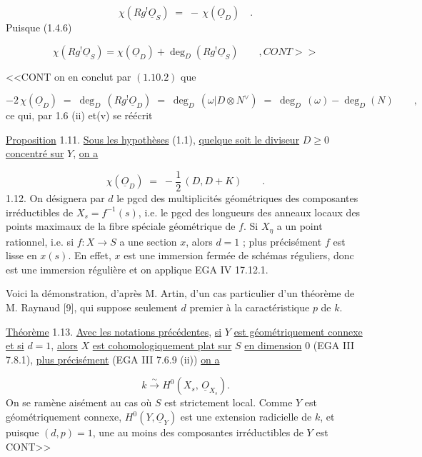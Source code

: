 \begin{equation*}
\chi(Rg^{!}\underline{O}_S) \;=\; -\,\chi(\underline{O}_D) \quad .
\end{equation*}
Puisque (1.4.6)

\begin{equation*}
\chi(Rg^{!}\underline{O}_S) = \chi(\underline{O}_D) + \deg_D(Rg^{!}\underline{O}_S) \qquad , CONT>>
\end{equation*}


<<CONT on en conclut par $(1.10.2)$ que

\begin{equation*}
- 2\,\chi(\underline{O}_D) \;=\; \deg_D\,(Rg^{!}\underline{O}_D) \;=\; \deg_D\,(\omega|D \otimes N^{\vee}) \;=\; \deg_D\,(\omega) - \deg_D(N) \qquad ,
\end{equation*}
ce qui, par 1.6 (ii) et(v) se réécrit

\underline{Proposition} 1.11. \underline{Sous les hypothèses} (1.1), \underline{quelque soit le diviseur} $D \geq 0$ \underline{concentré sur} $Y$, \underline{on a}

\begin{equation*}
\chi(\underline{O}_D) \;=\; - \frac{1}{2}\,(D,D+K) \qquad .
\end{equation*}
1.12. On désignera par $d$ le pgcd des multiplicités géométriques des composantes irréductibles de $X_s = f^{-1}(s)$, i.e. le pgcd des longueurs des anneaux locaux des points maximaux de la fibre spéciale géométrique de $f$. Si $X_{\eta}$ a un point rationnel, i.e. si $f : X \longrightarrow S$ a une section $x$, alors $d = 1$ ; plus précisément $f$ est lisse en $x(s)$. En effet, $x$ est une immersion fermée de schémas réguliers, donc est une immersion régulière et on applique EGA IV 17.12.1.

Voici la démonstration, d'après M. Artin, d'un cas particulier d'un théorème de M. Raynaud [9], qui suppose seulement $d$ premier à la caractéristique $p$ de $k$.

\underline{Théorème} 1.13. \underline{Avec les notations précédentes}, \underline{si} $Y$ \underline{est géométriquement connexe et si} $d = 1$, \underline{alors} $X$ \underline{est cohomologiquement plat sur} $S$ \underline{en dimension} 0 (EGA III 7.8.1), \underline{plus précisément} (EGA III 7.6.9 (ii)) \underline{on a}

\begin{equation*}
k \xrightarrow{\;\sim\;} H^0(X_s,\, \underline{O}_{X_s}).
\end{equation*}
On se ramène aisément au cas où $S$ est strictement local. Comme $Y$ est géométriquement connexe, $H^0(Y,\underline{O}_Y)$ est une extension radicielle de $k$, et puisque $(d,p)=1$, une au moins des composantes irréductibles de $Y$ est CONT>>


